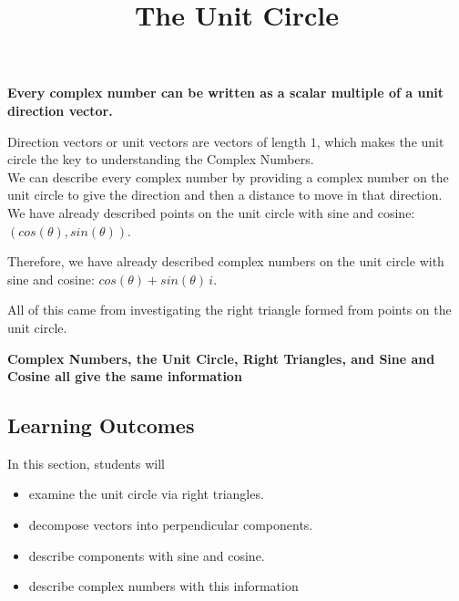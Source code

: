 \documentclass{ximera}
\title{The Unit Circle}
\begin{document}
\begin{abstract}
\end{abstract}
\maketitle




\begin{center}
\textbf{\textcolor{red!80!black}{Every complex number can be written as a scalar multiple of a unit direction vector.}}
\end{center}






Direction vectors or unit vectors are vectors of length $1$, which makes the unit circle the key to understanding the Complex Numbers. \\ 



We can describe every complex number by providing a complex number on the unit circle to give the direction and then a distance to move in that direction.  \\ 

We have already described points on the unit circle with sine and cosine: $(cos(\theta), sin(\theta))$. 

Therefore, we have already described complex numbers on the unit circle with sine and cosine: $cos(\theta) + sin(\theta) \, i$.  


All of this came from investigating the right triangle formed from points on the unit circle. \\



\begin{center}
\textbf{\textcolor{purple!85!blue}{Complex Numbers, the Unit Circle, Right Triangles, and Sine and Cosine all give the same information}}
\end{center}









\subsection{Learning Outcomes}


\begin{sectionOutcomes}
In this section, students will 

\begin{itemize}
\item examine the unit circle via right triangles.
\item decompose vectors into perpendicular components.
\item describe components with sine and cosine.
\item describe complex numbers with this information
\end{itemize}
\end{sectionOutcomes}
\end{document}

